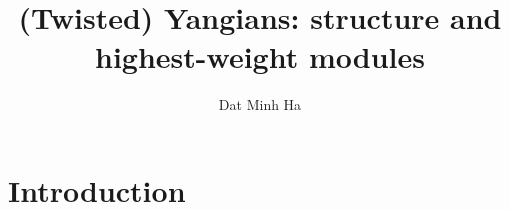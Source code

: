 

\setcounter{section}{-1}


\newcommand{\romanzero}{\mathsf{0}}
\newcommand{\romanone}{\mathsf{I}}
\newcommand{\romantwo}{\mathsf{II}}
\newcommand{\romanthree}{\mathsf{III}}



    \title{
        (Twisted) Yangians: structure and highest-weight modules
    }
    
    \author{Dat Minh Ha}
    \maketitle
    
    \begin{abstract}
        
    \end{abstract}
    
    {
    \hypersetup{} 
    \tableofcontents %
    }

    \section{Introduction}

    

    

    

    

    \begin{appendices}
        

        
    \end{appendices}
    
    \printbibliography

